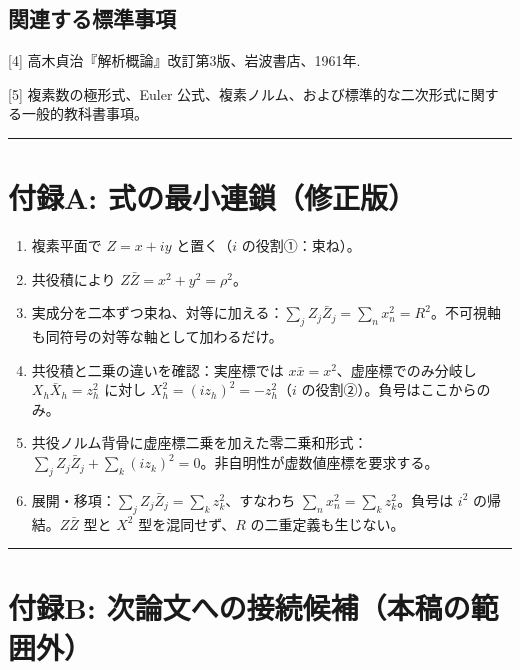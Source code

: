 \documentclass[11pt,a4paper]{ltjsarticle}
\providecommand{\tightlist}{\setlength{\itemsep}{0pt}\setlength{\parskip}{0pt}}
\begin{document}
\subsection{関連する標準事項}\label{ux95a2ux9023ux3059ux308bux6a19ux6e96ux4e8bux9805}

{[}4{]} 高木貞治『解析概論』改訂第3版、岩波書店、1961年.

{[}5{]} 複素数の極形式、Euler
公式、複素ノルム、および標準的な二次形式に関する一般的教科書事項。

\begin{center}\rule{0.5\linewidth}{0.5pt}\end{center}

\section{付録A:
式の最小連鎖（修正版）}\label{ux4ed8ux9332a-ux5f0fux306eux6700ux5c0fux9023ux9396ux4feeux6b63ux7248}

\begin{enumerate}
\def\labelenumi{\arabic{enumi}.}
\tightlist
\item
  複素平面で \(Z=x+iy\) と置く（\(i\) の役割①：束ね）。
\item
  共役積により \(Z\bar Z=x^2+y^2=\rho^2\)。
\item
  実成分を二本ずつ束ね、対等に加える：\(\displaystyle\sum_j Z_j\bar Z_j=\sum_n x_n^2=R^2\)。不可視軸も同符号の対等な軸として加わるだけ。
\item
  共役積と二乗の違いを確認：実座標では
  \(x\bar x=x^2\)、虚座標でのみ分岐し \(X_h\bar X_h=z_h^2\) に対し
  \(X_h^2=(i z_h)^2=-z_h^2\)（\(i\) の役割②）。負号はここからのみ。
\item
  共役ノルム背骨に虚座標二乗を加えた零二乗和形式：\(\displaystyle\sum_j Z_j\bar Z_j+\sum_k (i z_k)^2=0\)。非自明性が虚数値座標を要求する。
\item
  展開・移項：\(\displaystyle\sum_j Z_j\bar Z_j=\sum_k z_k^2\)、すなわち
  \(\displaystyle\sum_{n} x_n^2=\sum_{k} z_k^2\)。負号は \(i^2\)
  の帰結。\(Z\bar Z\) 型と \(X^2\) 型を混同せず、\(R\)
  の二重定義も生じない。
\end{enumerate}

\begin{center}\rule{0.5\linewidth}{0.5pt}\end{center}

\section{付録B:
次論文への接続候補（本稿の範囲外）}\label{ux4ed8ux9332b-ux6b21ux8ad6ux6587ux3078ux306eux63a5ux7d9aux5019ux88dcux672cux7a3fux306eux7bc4ux56f2ux5916}
\end{document}
